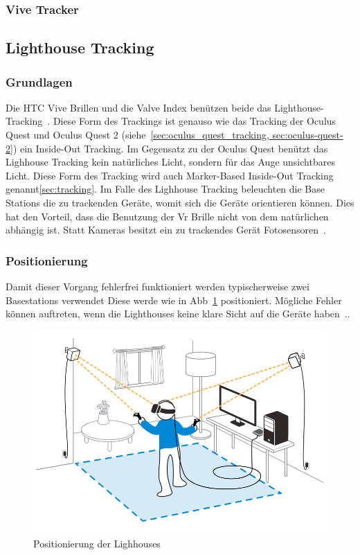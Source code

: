 \subsubsection{Vive Tracker}\label{sec:vive-tracker}

\subsection{Lighthouse Tracking}\label{sec:lighthouse_tracking}

\subsubsection{Grundlagen}

Die HTC Vive Brillen und die Valve Index benützen beide das Lighthouse-Tracking~\cite{steam_lighhouse_versions}.
Diese Form des Trackings ist genauso wie das Tracking der Oculus Quest und Oculus Quest 2 (siehe~\ref{sec:oculus_quest_tracking, sec:oculus-quest-2}) ein Inside-Out Tracking.
Im Gegensatz zu der Oculus Quest benützt das Lighhouse Tracking kein natürliches Licht, sondern für das Auge unsichtbares Licht.
Diese Form des Tracking wird auch Marker-Based Inside-Out Tracking genannt\ref{sec:tracking}.
Im Falle des Lighhouse Tracking beleuchten die Base Stations die zu trackenden Geräte, womit sich die Geräte orientieren können.
Dies hat den Vorteil, dass die Benutzung der Vr Brille nicht von dem natürlichen abhängig ist.
Statt Kameras besitzt ein zu trackendes Gerät Fotosensoren~\cite{Buckley_2015}.

\subsubsection{Positionierung}

Damit dieser Vorgang fehlerfrei funktioniert werden typischerweise zwei Basestations verwendet
Diese werde wie in Abb~\ref{fig:basetstation_positioning} positioniert.
Mögliche Fehler können auftreten, wenn die Lighthouses keine klare Sicht auf die Geräte haben~\cite{steam_lighhouse_versions}..

\begin{figure}
    \centering
    \includegraphics[scale=0.4]{pics/basestations_positioning}
    \caption{Positionierung der Lighhouses~\cite{Sercan_2018}}
    \label{fig:basetstation_positioning}
\end{figure}


